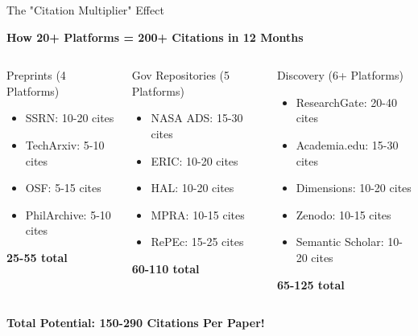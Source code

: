 \documentclass[10pt, aspectratio=169]{beamer}
\begin{document}
	\begin{frame}{The "Citation Multiplier" Effect}
		\begin{center}
			\Large{\textbf{How 20+ Platforms = 200+ Citations in 12 Months}}
		\end{center}
		
		\vspace{0.3cm}
		\begin{columns}[T]
			\begin{block}{Preprints (4 Platforms)}
				\tiny
				\begin{itemize}
					\item SSRN: 10-20 cites
					\item TechArxiv: 5-10 cites
					\item OSF: 5-15 cites
					\item PhilArchive: 5-10 cites
				\end{itemize}
				\textbf{\textcolor{myblue}{25-55 total}}
			\end{block}
			
			\begin{block}{Gov Repositories (5 Platforms)}
				\tiny
				\begin{itemize}
					\item NASA ADS: 15-30 cites
					\item ERIC: 10-20 cites
					\item HAL: 10-20 cites
					\item MPRA: 10-15 cites
					\item RePEc: 15-25 cites
				\end{itemize}
				\textbf{\textcolor{myblue}{60-110 total}}
			\end{block}
			
			\begin{block}{Discovery (6+ Platforms)}
				\tiny
				\begin{itemize}
					\item ResearchGate: 20-40 cites
					\item Academia.edu: 15-30 cites
					\item Dimensions: 10-20 cites
					\item Zenodo: 10-15 cites
					\item Semantic Scholar: 10-20 cites
				\end{itemize}
				\textbf{\textcolor{myblue}{65-125 total}}
			\end{block}
		\end{columns}
		
		\vspace{0.2cm}
		\begin{center}
			\textcolor{myorange}{\Large \textbf{Total Potential: 150-290 Citations Per Paper!}}
			
			\vspace{0.2cm}
		\end{center}
	\end{frame}
	
\end{document}
